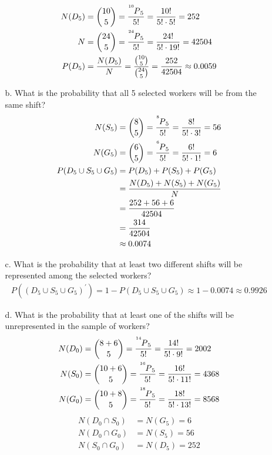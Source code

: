 \documentclass[letterpaper,12pt]{article}
\newcommand\perm[2]{\prescript{^{#1}\mkern-2.5mu}{}P_{#2}}
\newcommand\calc[1]{\pgfmathparse{#1}\pgfmathprintnumber{\pgfmathresult}}
\newcommand\comba[2]{\frac{\perm{#1}{#2}}{#2!}}
\newcommand\combc[2]{\frac{#1!}{#2! \cdot \calc{#1 - #2}!}}
\begin{document}
\begin{enumerate}
\begin{enumerate}
        \begin{align*}
          N(D_5) &= \binom{10}{5} = \comba{10}{5} = \combc{10}{5} = 252 \\
          N &= \binom{24}{5} = \comba{24}{5} = \combc{24}{5} = 42504 \\
          P(D_5) &= \frac{N(D_5)}{N} = \frac{\binom{10}{5}}{\binom{24}{5}} = \frac{252}{42504} \approx 0.0059
        \end{align*}
      \item[b.]
        What is the probability that all 5 selected workers will be from the same shift?
        \begin{align*}
          N(S_5) &= \binom{8}{5} = \comba{8}{5} = \combc{8}{5} = 56 \\
          N(G_5) &= \binom{6}{5} = \comba{6}{5} = \combc{6}{5} = 6 \\
          P(D_5 \cup S_5 \cup G_5) &= P(D_5) + P(S_5) + P(G_5) \\
          &= \frac{N(D_5) + N(S_5) + N(G_5)}{N} \\
          &= \frac{252 + 56 + 6}{42504} \\
          &= \frac{314}{42504} \\
          &\approx 0.0074
        \end{align*}
      \item[c.]
        What is the probability that at least two different shifts will be represented among the selected workers?
        \begin{align*}
          P((D_5 \cup S_5 \cup G_5)^\prime) = 1 - P(D_5 \cup S_5 \cup G_5) \approx 1 - 0.0074 \approx 0.9926
        \end{align*}
      \item[d.]
        What is the probability that at least one of the shifts will be unrepresented in the sample of workers?
        \begin{align*}
          N(D_0) &= \binom{8 + 6}{5} = \comba{14}{5} = \combc{14}{5} = 2002 \\
          N(S_0) &= \binom{10 + 6}{5} = \comba{16}{5} = \combc{16}{5} = 4368 \\
          N(G_0) &= \binom{10 + 8}{5} = \comba{18}{5} = \combc{18}{5} = 8568
        \end{align*}
        \begin{align*}
          N(D_0 \cap S_0) &= N(G_5) = 6 \\
          N(D_0 \cap G_0) &= N(S_5) = 56 \\
          N(S_0 \cap G_0) &= N(D_5) = 252 \\

\end{align*}
\end{enumerate}
\end{enumerate}
\end{document}

